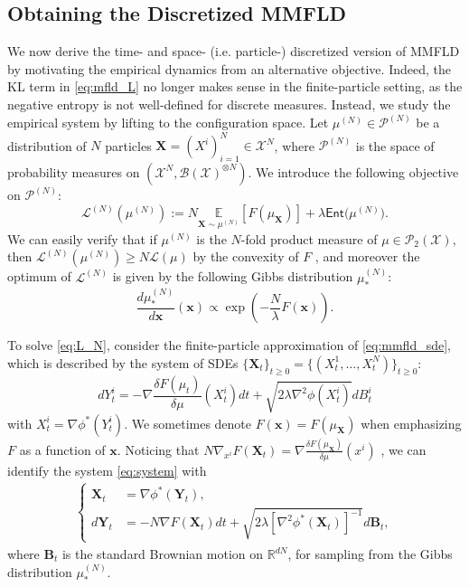 \documentclass{article}
\begin{document}
\subsection{Obtaining the Discretized MMFLD}\label{sec:discrete}

We now derive the time- and space- (i.e. particle-) discretized version of MMFLD by motivating the empirical dynamics from an alternative objective. Indeed, the KL term in \eqref{eq:mfld_L} no longer makes sense in the finite-particle setting, as the negative entropy is not well-defined for discrete measures. Instead, we study the empirical system by lifting to the configuration space. Let $\mu^{(N)}\in\mathcal{P}^{(N)}$ be a distribution of $N$ particles $\mathbf{X} = (X^i)_{i=1}^N\in \mathcal{X}^N$, where $\mathcal{P}^{(N)}$ is the space of probability measures on $(\mathcal{X}^N, \mathcal{B}(\mathcal{X})^{\otimes N})$. We introduce the following objective on $\mathcal{P}^{(N)}$: \begin{equation}\label{eq:L_N}
    \mathcal{L}^{(N)}(\mu^{(N)}) := N \underset{\mathbf{X}\sim \mu^{(N)}}{\mathbb{E}}[F(\mu_\mathbf{X})]+\lambda{\mathsf{Ent}(\mu^{(N)}}).
\end{equation}
We can easily verify that if $\mu^{(N)}$ is the $N$-fold product measure of $\mu\in \mathcal{P}_2(\mathcal{X})$, then $\mathcal{L}^{(N)}(\mu^{(N)})\ge N\mathcal{L}(\mu)$ by the convexity of $F$ \citep{suzuki2023meanfield,nitanda2024improved}, and moreover the optimum of $\mathcal{L}^{(N)}$ is given by the following Gibbs distribution  $\mu_*^{(N)}$:
\begin{equation*}
    \frac{d\mu_*^{(N)}}{d\mathbf{x}}(\mathbf{x})\propto \exp\left(-\frac{N}{\lambda}F(\mathbf{x})\right).
\end{equation*}

To solve \eqref{eq:L_N}, consider the  finite-particle approximation of \eqref{eq:mmfld_sde}, which is described by the system of SDEs $\{\mathbf{X}_t\}_{t\ge0} = \{(X_t^1,\dots, X_t^N)\}_{t\ge0}$: \begin{equation}
dY_{t}^i =  -\nabla\frac{\delta F(\mu_t)}{\delta\mu}(X_t^i)dt + \sqrt{2\lambda\nabla^2\phi(X_t^i)}dB_t^i\label{eq:system}    
\end{equation}
with 
$X_{t}^i = \nabla\phi^*(Y_{t}^i)$. We sometimes denote $F(\mathbf{x}) = F(\mu_\mathbf{X})$ when emphasizing $F$ as a function of $\mathbf{x}$. Noticing that $N\nabla_{x^i}F(\mathbf{X}_t) = \nabla \frac{\delta F(\mu_\mathbf{X})}{\delta\mu}(x^i)$ \citep{chizat2022meanfield}, we can identify the system \eqref{eq:system} with
\begin{align*}
    \begin{cases}
    \mathbf{X}_t &= \nabla\phi^*(\mathbf{Y}_t),\\
        d\mathbf{Y}_t &= -N\nabla F(\mathbf{X}_t)dt + \sqrt{2\lambda[\nabla^2\phi^*(\mathbf{X}_t)]^{-1}}d\mathbf{B}_t,
    \end{cases}
\end{align*}
where $\mathbf{B}_t$ is the standard Brownian motion on $\mathbb{R}^{dN}$, for sampling from the Gibbs distribution $\mu_*^{(N)}$.
\end{document}
